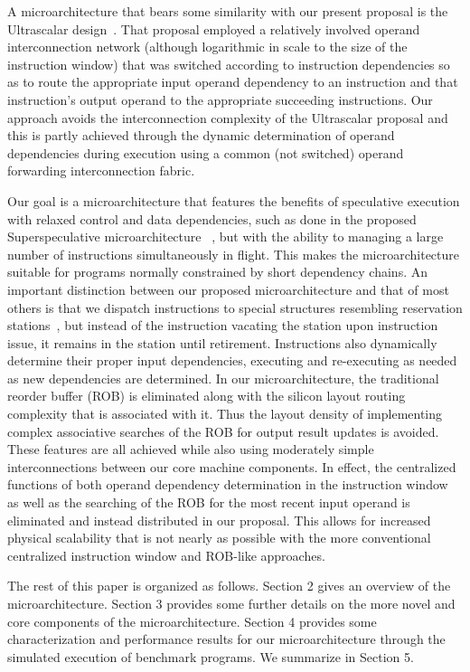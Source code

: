 \documentclass[10pt,dvips]{article}
\begin{document}
A microarchitecture that bears some similarity with our present
proposal is the Ultrascalar design~\cite{henry99}.
That proposal employed a relatively involved operand interconnection
network (although logarithmic in scale to the size of the
instruction window) that was switched according to 
instruction dependencies so as to route the appropriate input
operand dependency to an instruction and that instruction's
output operand to the appropriate
succeeding instructions.
Our approach avoids the interconnection complexity of the 
Ultrascalar proposal and this is partly
achieved through the dynamic determination of operand dependencies
during execution using a common (not switched) operand forwarding
interconnection fabric.

Our goal is a microarchitecture
that features the benefits of speculative execution with 
relaxed control and data dependencies,
such as done in the proposed Superspeculative 
microarchitecture ~\cite{Lip97}, but with the ability
to managing a large number of instructions simultaneously in flight.
This makes the microarchitecture
suitable for programs normally constrained by short dependency chains.
An important distinction between our proposed microarchitecture and
that of most others is that we dispatch instructions to special structures
resembling reservation stations~\cite{Anderson67,Tom67},
but instead of the instruction
vacating the station upon instruction issue, it
remains in the station until retirement.
Instructions also
dynamically determine their proper input dependencies,
executing and re-executing as needed as new dependencies
are determined.
In our microarchitecture, the traditional reorder buffer (ROB)
is eliminated along with the silicon layout routing complexity
that is associated with it.  
Thus the layout density of implementing
complex associative searches of the ROB for output result updates
is avoided.
These features are all achieved while also using moderately
simple interconnections between our core machine components.
In effect, the centralized functions of both operand dependency determination
in the instruction window
as well as the searching of the ROB for the most recent input operand
is eliminated and instead distributed in our proposal.
This allows for increased physical scalability that is not nearly
as possible with the more conventional
centralized instruction window and ROB-like approaches.

The rest of this paper is organized as follows.
Section 2 gives an overview of the microarchitecture.
Section 3 provides some further details on the more
novel and core components of the microarchitecture.
Section 4 provides some characterization and performance 
results for our microarchitecture through the simulated
execution of benchmark programs.
We summarize in Section 5.
%
\vspace{-0.15in}
\end{document}
